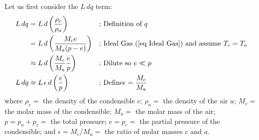 Let us first consider the \(L\,dq\) term:
\begin{align*}
    L\,dq&=L\, d \left( \frac{\rho_c}{\rho_a} \right)
        &\text{; }
        &\text{Definition of }q
        \\
        &=L\, d \left( \frac{M_c e}{M_a (p-e)} \right)
        &\text{; }
        &\text{Ideal Gas (\ref{eq Ideal Gas}) and assume }T_c=T_a
        \\
        &\approx L\, d \left( \frac{M_c}{M_a} \frac{e}{p} \right)
        &\text{; }
        &\text{Dilute so }e\ll p
        \\
    L\,dq&\approx L \,\epsilon \,d \left( \frac{e}{p} \right)
        &\text{; }
        &\text{Define}\epsilon=\frac{M_c}{M_a}
\end{align*}
where \(\rho_c=\) the density of the condensible \(c\); \(\rho_a=\) the density of the air \(a\); \(M_c=\) the molar mass of the condensible; \(M_a=\) the molar mass of the air; \(p=p_a+p_c=\) the total pressure; \(e=p_c=\) the partial pressure of the condensible; and \(\epsilon=M_c/M_a=\) the ratio of molar masses \(c\) and \(a\).

